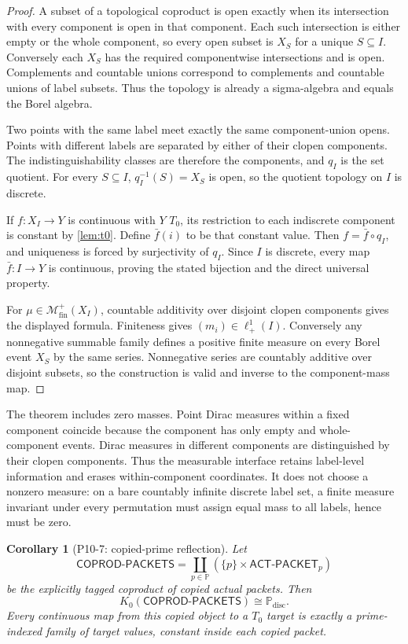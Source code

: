 \documentclass[11pt]{article}
\newtheorem{corollary}[theorem]{Corollary}
\theoremstyle{definition}
\newcommand{\Pp}{\mathbb P}
\newcommand{\Mfin}{\mathcal M_{\mathrm{fin}}^+}
\newcommand{\ACTP}{\mathsf{ACT\mbox{-}PACKET}_p}
\newcommand{\Kzero}{K_0}
\begin{document}
\begin{proof}
A subset of a topological coproduct is open exactly when its intersection with every component is open in that component.  Each such intersection is either empty or the whole component, so every open subset is $X_S$ for a unique $S\subseteq I$.  Conversely each $X_S$ has the required componentwise intersections and is open.  Complements and countable unions correspond to complements and countable unions of label subsets.  Thus the topology is already a sigma-algebra and equals the Borel algebra.

Two points with the same label meet exactly the same component-union opens.  Points with different labels are separated by either of their clopen components.  The indistinguishability classes are therefore the components, and $q_I$ is the set quotient.  For every $S\subseteq I$, $q_I^{-1}(S)=X_S$ is open, so the quotient topology on $I$ is discrete.

If $f:X_I\to Y$ is continuous with $Y$ $T_0$, its restriction to each indiscrete component is constant by \cref{lem:t0}.  Define $\bar f(i)$ to be that constant value.  Then $f=\bar f\circ q_I$, and uniqueness is forced by surjectivity of $q_I$.  Since $I$ is discrete, every map $\bar f:I\to Y$ is continuous, proving the stated bijection and the direct universal property.

For $\mu\in\Mfin(X_I)$, countable additivity over disjoint clopen components gives the displayed formula.  Finiteness gives $(m_i)\in\ell^1_+(I)$.  Conversely any nonnegative summable family defines a positive finite measure on every Borel event $X_S$ by the same series.  Nonnegative series are countably additive over disjoint subsets, so the construction is valid and inverse to the component-mass map.
\end{proof}

The theorem includes zero masses.  Point Dirac measures within a fixed component coincide because the component has only empty and whole-component events.  Dirac measures in different components are distinguished by their clopen components.  Thus the measurable interface retains label-level information and erases within-component coordinates.  It does not choose a nonzero measure: on a bare countably infinite discrete label set, a finite measure invariant under every permutation must assign equal mass to all labels, hence must be zero.

\begin{corollary}[P10-7: copied-prime reflection]
\label{cor:primek0}
Let
\[
 \mathsf{COPROD\mbox{-}PACKETS}
   =\coprod_{p\in\Pp}(\{p\}\times\ACTP)
\]
be the explicitly tagged coproduct of copied actual packets.  Then
\[
 \Kzero(\mathsf{COPROD\mbox{-}PACKETS})\cong\Pp_{\mathrm{disc}}.
\]
Every continuous map from this copied object to a $T_0$ target is exactly a prime-indexed family of target values, constant inside each copied packet.
\end{corollary}
\end{document}
